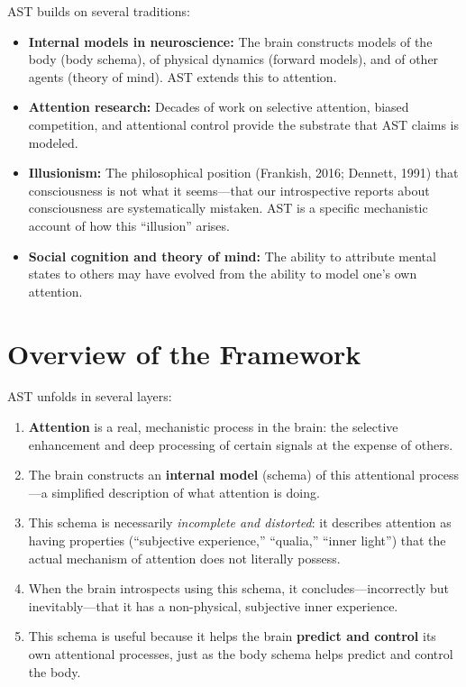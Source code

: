\documentclass[11pt,a4paper]{report}
\begin{document}
AST builds on several traditions:
\begin{itemize}[leftmargin=1.5em]
  \item \textbf{Internal models in neuroscience:} The brain constructs models of the body (body schema), of physical dynamics (forward models), and of other agents (theory of mind). AST extends this to attention.
  \item \textbf{Attention research:} Decades of work on selective attention, biased competition, and attentional control provide the substrate that AST claims is modeled.
  \item \textbf{Illusionism:} The philosophical position (Frankish, 2016; Dennett, 1991) that consciousness is not what it seems---that our introspective reports about consciousness are systematically mistaken. AST is a specific mechanistic account of how this ``illusion'' arises.
  \item \textbf{Social cognition and theory of mind:} The ability to attribute mental states to others may have evolved from the ability to model one's own attention.
\end{itemize}

\section{Overview of the Framework}

AST unfolds in several layers:

\begin{enumerate}[leftmargin=2em]
  \item \textbf{Attention} is a real, mechanistic process in the brain: the selective enhancement and deep processing of certain signals at the expense of others.
  \item The brain constructs an \textbf{internal model} (schema) of this attentional process---a simplified description of what attention is doing.
  \item This schema is necessarily \emph{incomplete and distorted}: it describes attention as having properties (``subjective experience,'' ``qualia,'' ``inner light'') that the actual mechanism of attention does not literally possess.
  \item When the brain introspects using this schema, it concludes---incorrectly but inevitably---that it has a non-physical, subjective inner experience.
  \item This schema is useful because it helps the brain \textbf{predict and control} its own attentional processes, just as the body schema helps predict and control the body.
\end{enumerate}
\end{document}
